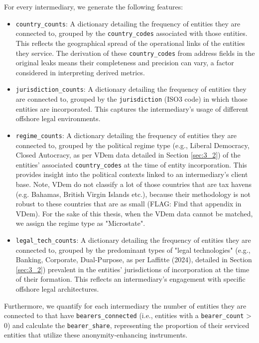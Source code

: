 For every intermediary, we generate the following features:

\begin{itemize}
   \item \texttt{country\_counts}: A dictionary detailing the frequency of entities they are connected to, grouped by the \texttt{country\_codes} associated with those entities. This reflects the geographical spread of the operational links of the entities they service. The derivation of these \texttt{country\_codes} from address fields in the original leaks means their completeness and precision can vary, a factor considered in interpreting derived metrics.
   \item \texttt{jurisdiction\_counts}: A dictionary detailing the frequency of entities they are connected to, grouped by the \texttt{jurisdiction} (ISO3 code) in which those entities are incorporated. This captures the intermediary's usage of different offshore legal environments.
   \item \texttt{regime\_counts}: A dictionary detailing the frequency of entities they are connected to, grouped by the political regime type (e.g., Liberal Democracy, Closed Autocracy, as per VDem data detailed in Section \ref{sec:3_2}) of the entities' associated \texttt{country\_codes} at the time of entity incorporation. This provides insight into the political contexts linked to an intermediary's client base. Note, VDem do not classify a lot of those countries that are tax havens (e.g. Bahamas, British Virgin Islands etc.), because their methodology is not robust to these countries that are as small (FLAG: Find that appendix in VDem). For the sake of this thesis, when the VDem data cannot be matched, we assign the regime type as "Microstate".
   \item \texttt{legal\_tech\_counts}: A dictionary detailing the frequency of entities they are connected to, grouped by the predominant types of "legal technologies" (e.g., Banking, Corporate, Dual-Purpose, as per Laffitte (2024), detailed in Section \ref{sec:3_2}) prevalent in the entities' jurisdictions of incorporation at the time of their formation. This reflects an intermediary's engagement with specific offshore legal architectures.
\end{itemize}

Furthermore, we quantify for each intermediary the number of entities they are connected to that have \texttt{bearers\_connected} (i.e., entities with a \texttt{bearer\_count} > 0) and calculate the \texttt{bearer\_share}, representing the proportion of their serviced entities that utilize these anonymity-enhancing instruments.


